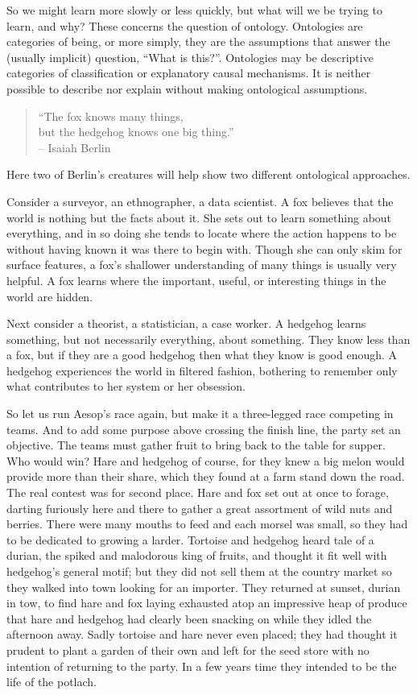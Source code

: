 \documentclass[]{book}
\begin{document}
So we might learn more slowly or less quickly, but what will we be
trying to learn, and why? These concerns the question of ontology.
Ontologies are categories of being, or more simply, they are the
assumptions that answer the (usually implicit) question, ``What is
this?''. Ontologies may be descriptive categories of classification or
explanatory causal mechanisms. It is neither possible to describe nor
explain without making ontological assumptions.

\begin{quote}
``The fox knows many things,\\
but the hedgehog knows one big thing.''\\
-- Isaiah Berlin\citeyearpar[1]{Berlin1953Hedgehog}
\end{quote}

Here two of Berlin's creatures will help show two different ontological
approaches.

Consider a surveyor, an ethnographer, a data scientist. A fox believes
that the world is nothing but the facts about it. She sets out to learn
something about everything, and in so doing she tends to locate where
the action happens to be without having known it was there to begin
with. Though she can only skim for surface features, a fox's shallower
understanding of many things is usually very helpful. A fox learns where
the important, useful, or interesting things in the world are hidden.

Next consider a theorist, a statistician, a case worker. A hedgehog
learns something, but not necessarily everything, about something. They
know less than a fox, but if they are a good hedgehog then what they
know is good enough. A hedgehog experiences the world in filtered
fashion, bothering to remember only what contributes to her system or
her obsession.

So let us run Aesop's race again, but make it a three-legged race
competing in teams. And to add some purpose above crossing the finish
line, the party set an objective. The teams must gather fruit to bring
back to the table for supper. Who would win? Hare and hedgehog of
course, for they knew a big melon would provide more than their share,
which they found at a farm stand down the road. The real contest was for
second place. Hare and fox set out at once to forage, darting furiously
here and there to gather a great assortment of wild nuts and berries.
There were many mouths to feed and each morsel was small, so they had to
be dedicated to growing a larder. Tortoise and hedgehog heard tale of a
durian, the spiked and malodorous king of fruits, and thought it fit
well with hedgehog's general motif; but they did not sell them at the
country market so they walked into town looking for an importer. They
returned at sunset, durian in tow, to find hare and fox laying exhausted
atop an impressive heap of produce that hare and hedgehog had clearly
been snacking on while they idled the afternoon away. Sadly tortoise and
hare never even placed; they had thought it prudent to plant a garden of
their own and left for the seed store with no intention of returning to
the party. In a few years time they intended to be the life of the
potlach.
\end{document}
